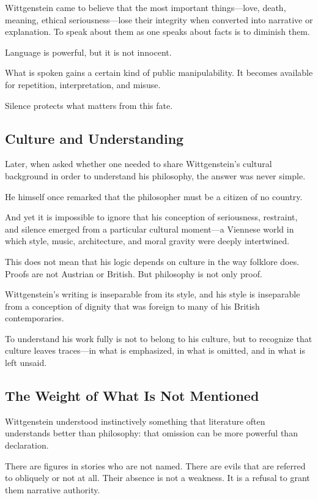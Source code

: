 \documentclass[11pt]{article}
\begin{document}
Wittgenstein came to believe that the most important things—love, death, meaning, ethical seriousness—lose their integrity when converted into narrative or explanation. To speak about them as one speaks about facts is to diminish them.

Language is powerful, but it is not innocent.

What is spoken gains a certain kind of public manipulability. It becomes available for repetition, interpretation, and misuse.

Silence protects what matters from this fate.

\subsection*{Culture and Understanding}

Later, when asked whether one needed to share Wittgenstein’s cultural background in order to understand his philosophy, the answer was never simple.

He himself once remarked that the philosopher must be a citizen of no country.

And yet it is impossible to ignore that his conception of seriousness, restraint, and silence emerged from a particular cultural moment—a Viennese world in which style, music, architecture, and moral gravity were deeply intertwined.

This does not mean that his logic depends on culture in the way folklore does. Proofs are not Austrian or British. But philosophy is not only proof.

Wittgenstein’s writing is inseparable from its style, and his style is inseparable from a conception of dignity that was foreign to many of his British contemporaries.

To understand his work fully is not to belong to his culture, but to recognize that culture leaves traces—in what is emphasized, in what is omitted, and in what is left unsaid.

\subsection*{The Weight of What Is Not Mentioned}

Wittgenstein understood instinctively something that literature often understands better than philosophy: that omission can be more powerful than declaration.

There are figures in stories who are not named. There are evils that are referred to obliquely or not at all. Their absence is not a weakness. It is a refusal to grant them narrative authority.
\end{document}
